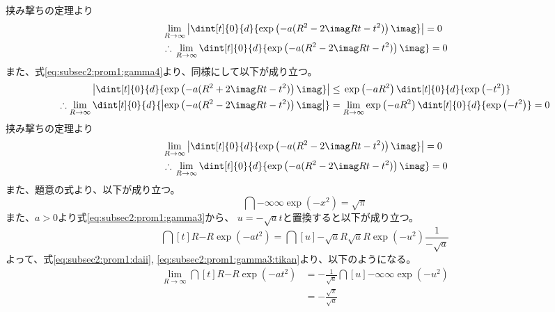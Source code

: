 \documentclass[dvipdfmx,titlepage, 11pt, a4paper]{jsarticle}%
\begin{document}
\begin{enumerate}[(1)]
    挟み撃ちの定理より
    \begin{align}
        &\lim_{R \to \infty} \left\lvert \dint[t]{0}{d}{\exp\left(-a(R^2 - 2\imag Rt - t^2)\right)\imag}\right\rvert = 0\nonumber\\
        &\therefore\, \lim_{R \to \infty} \dint[t]{0}{d}{\exp\left(-a(R^2 - 2\imag Rt - t^2)\right)\imag} = 0\label{eq:subsec2:prom1:gamma2:kyokugen}
    \end{align}
    また、式\eqref{eq:subsec2:prom1:gamma4}より、同様にして以下が成り立つ。
    \begin{align*}
        \left\lvert \dint[t]{0}{d}{\exp\left(-a(R^2 + 2\imag Rt - t^2)\right)\imag}\right\rvert
        &\leq \, \exp\left(-aR^2\right)\dint[t]{0}{d}{\exp\left(- t^2\right)}\\
        \therefore \lim_{R \to \infty} \dint[t]{0}{d}{\left\lvert\exp\left(-a(R^2 - 2\imag Rt - t^2)\right)\imag\right\rvert}
        &= \lim_{R \to \infty}\exp\left(-aR^2\right)\dint[t]{0}{d}{\exp\left(- t^2\right)} = 0
    \end{align*}
    挟み撃ちの定理より
    \begin{align}
        &\lim_{R \to \infty} \left\lvert \dint[t]{0}{d}{\exp\left(-a(R^2 - 2\imag Rt - t^2)\right)\imag}\right\rvert = 0\nonumber\\
        &\therefore\, \lim_{R \to \infty} \dint[t]{0}{d}{\exp\left(-a(R^2 - 2\imag Rt - t^2)\right)\imag} = 0\label{eq:subsec2:prom1:gamma4:kyokugen}
    \end{align}
    また、題意の式より、以下が成り立つ。
    \begin{equation}
        \dint{-\infty}{\infty}{\exp\left(-x^2\right)} = \sqrt{\pi}\label{eq:subsec2:prom1:daii}
    \end{equation}
    また、$a > 0$より式\eqref{eq:subsec2:prom1:gamma3}から、
    $u = -\sqrt{a}t$と置換すると以下が成り立つ。
    \begin{equation}
        \dint[t]{R}{-R}{\exp\left(-at^2\right)}
        = \dint[u]{-\sqrt{a}R}{\sqrt{a}R}{\exp\left(-u^2\right)\frac{1}{-\sqrt{a}}}\label{eq:subsec2:prom1:gamma3:tikan}
    \end{equation}
    よって、式\eqref{eq:subsec2:prom1:daii}, \eqref{eq:subsec2:prom1:gamma3:tikan}より、以下のようになる。
    \begin{align}
        \lim_{R \to \infty} \dint[t]{R}{-R}{\exp\left(-at^2\right)}
        &= -\frac{1}{\sqrt{a}}\dint[u]{-\infty}{\infty}{\exp\left(-u^2\right)}\nonumber\\
        &= -\frac{\sqrt{\pi}}{\sqrt{a}}\label{eq:subsec2:prom1:gamma3:ans}

\end{align}
\end{enumerate}
\end{document}
